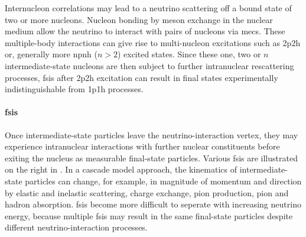 %
Internucleon correlations may lead to a neutrino scattering off a bound state of two or more nucleons. Nucleon bonding by meson exchange in the nuclear medium allow the neutrino to interact with pairs of nucleons via \acrshort{mec}s. These multiple-body interactions can give rise to multi-nucleon excitations such as \acrshort{2p2h} or, generally more \acrshort{npnh} ($n>2$) excited states. Since these one, two or $n$ intermediate-state nucleons are then subject to further intranuclear rescattering processes, \acrshort{fsi}s after \acrshort{2p2h} excitation can result in final states experimentally indistinguishable from \acrshort{1p1h} processes.

\paragraph{\acrlong{fsi}s}
Once intermediate-state particles leave the neutrino-interaction vertex, they may experience intranuclear interactions with further nuclear constituents before exiting the nucleus as measurable final-state particles. Various \acrshort{fsi}s are illustrated on the right in . In a cascade model approach, the kinematics of intermediate-state particles can change, for example, in magnitude of momentum and direction by elastic and inelastic scattering, charge exchange, pion production, pion and hadron absorption. \acrshort{fsi}s become more difficult to seperate with increasing neutrino energy, because multiple \acrshort{fsi}s may result in the same final-state particles despite different neutrino-interaction processes.

